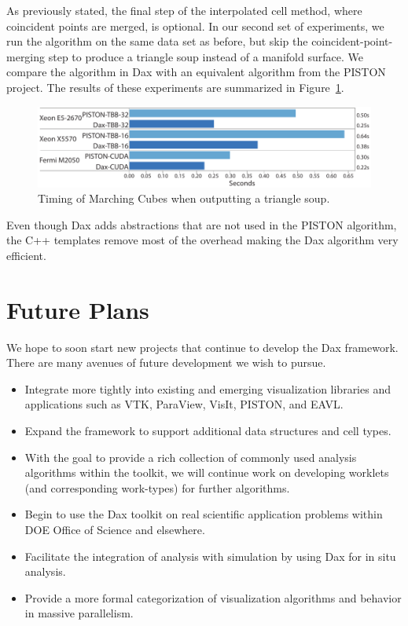 As previously stated, the final step of the interpolated cell method, where
coincident points are merged, is optional. In our second set of
experiments, we run the algorithm on the same data set as before, but skip
the coincident-point-merging step to produce a triangle soup instead of a
manifold surface. We compare the algorithm in Dax with an equivalent
algorithm from the PISTON project. The results of these experiments are
summarized in Figure~\ref{fig:TimingMCSoup}.

\begin{figure}[htb]
  \centering
  \includegraphics{images/TimingMCSoup}
  \caption{Timing of Marching Cubes when outputting a triangle soup.}
  \label{fig:TimingMCSoup}
\end{figure}

Even though Dax adds abstractions that are not used in the PISTON
algorithm, the C++ templates remove most of the overhead making the Dax
algorithm very efficient.

\section{Future Plans}

We hope to soon start new projects that continue to develop the Dax
framework. There are many avenues of future development we wish to pursue.

\begin{itemize}
\item Integrate more tightly into existing and emerging visualization
  libraries and applications such as VTK, ParaView, VisIt, PISTON, and
  EAVL.
\item Expand the framework to support additional data structures and cell
  types.
\item With the goal to provide a rich collection of commonly used analysis
  algorithms within the toolkit, we will continue work on developing
  worklets (and corresponding work-types) for further algorithms.
\item Begin to use the Dax toolkit on real scientific application problems
  within DOE Office of Science and elsewhere.
\item Facilitate the integration of analysis with simulation by using Dax
  for in situ analysis.
\item Provide a more formal categorization of visualization algorithms and
  behavior in massive parallelism.
\end{itemize}
